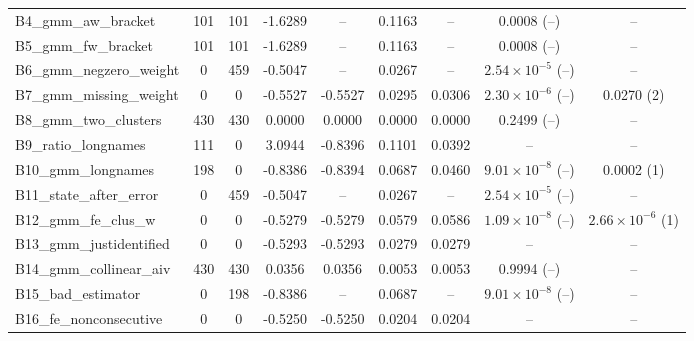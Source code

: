 \begin{table}[htbp]
\begin{tabular}{l cc cc cc cc}
B4\_gmm\_aw\_bracket & 101 & 101 & -1.6289 & -- & 0.1163 & -- & 0.0008 (--) & -- \\
B5\_gmm\_fw\_bracket & 101 & 101 & -1.6289 & -- & 0.1163 & -- & 0.0008 (--) & -- \\
B6\_gmm\_negzero\_weight & 0 & 459 & -0.5047 & -- & 0.0267 & -- & $2.54\times 10^{-5}$ (--) & -- \\
B7\_gmm\_missing\_weight & 0 & 0 & -0.5527 & -0.5527 & 0.0295 & 0.0306 & $2.30\times 10^{-6}$ (--) & 0.0270 (2) \\
B8\_gmm\_two\_clusters & 430 & 430 & 0.0000 & 0.0000 & 0.0000 & 0.0000 & 0.2499 (--) & -- \\
B9\_ratio\_longnames & 111 & 0 & 3.0944 & -0.8396 & 0.1101 & 0.0392 & -- & -- \\
B10\_gmm\_longnames & 198 & 0 & -0.8386 & -0.8394 & 0.0687 & 0.0460 & $9.01\times 10^{-8}$ (--) & 0.0002 (1) \\
B11\_state\_after\_error & 0 & 459 & -0.5047 & -- & 0.0267 & -- & $2.54\times 10^{-5}$ (--) & -- \\
B12\_gmm\_fe\_clus\_w & 0 & 0 & -0.5279 & -0.5279 & 0.0579 & 0.0586 & $1.09\times 10^{-8}$ (--) & $2.66\times 10^{-6}$ (1) \\
B13\_gmm\_justidentified & 0 & 0 & -0.5293 & -0.5293 & 0.0279 & 0.0279 & -- & -- \\
B14\_gmm\_collinear\_aiv & 430 & 430 & 0.0356 & 0.0356 & 0.0053 & 0.0053 & 0.9994 (--) & -- \\
B15\_bad\_estimator & 0 & 198 & -0.8386 & -- & 0.0687 & -- & $9.01\times 10^{-8}$ (--) & -- \\
B16\_fe\_nonconsecutive & 0 & 0 & -0.5250 & -0.5250 & 0.0204 & 0.0204 & -- & -- \\
\bottomrule
\end{tabular}

\vspace{0.6em}
\begin{minipage}{\textwidth}
\footnotesize
\resultsnotes %
\end{minipage}
\end{table}
